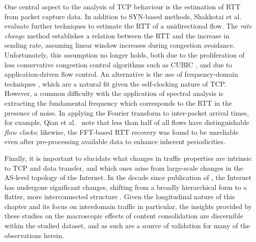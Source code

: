 One central aspect to the analysis of \ac{TCP} behaviour is the estimation of \ac{RTT} from packet capture data. 
In addition to SYN-based methods, Shakkotai et al.\ \cite{Shakkottai:2004p408} evaluate further techniques to estimate the \ac{RTT} of a unidirectional flow. 
The \textit{rate change} method establishes a relation between the \ac{RTT} and the increase in sending rate, assuming linear window increases during congestion avoidance. 
Unfortunately, this assumption no longer holds, both due to the proliferation of less conservative congestion control algorithms such as CUBIC \cite{Ha:2008p471}, and due to application-driven flow control. 
An alternative is the use of frequency-domain techniques \cite{Veal:2005p412,Lance:2005p565,Qian:2009p429}, which are a natural fit given the self-clocking nature of \ac{TCP}. 
However, a common difficulty with the application of spectral analysis is extracting the fundamental frequency which corresponds to the \ac{RTT} in the presence of noise. 
In applying the Fourier transform to inter-packet arrival times, for example, Qian et al.\ \cite{Qian:2009p429} note that less than half of all flows have distinguishable \textit{flow clocks}; likewise, the \ac{FFT}-based \ac{RTT} recovery was found to be unreliable even after pre-processing available data to enhance inherent periodicities.

Finally, it is important to elucidate what changes in traffic properties are intrinsic to \ac{TCP} and data transfer, and which ones arise from large-scale changes in the \ac{AS}-level topology of the Internet. 
In the decade since publication of \cite{Zhang:2002p85}, the Internet has undergone significant changes, shifting from a broadly hierarchical form to a flatter, more interconnected structure \cite{Labovitz:2010p175,Ager:2012p567}.
Given the longitudinal nature of this chapter and its focus on interdomain traffic in particular, the insights provided by these studies on the macroscopic effects of content consolidation are discernible within the studied dataset, and as such are a source of validation for many of the observations herein.
